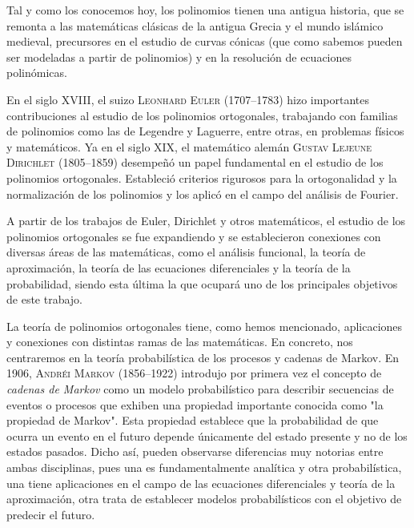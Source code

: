 %
%

Tal y como los conocemos hoy, los polinomios tienen una antigua historia, que se remonta a las matemáticas clásicas de la antigua Grecia y el mundo islámico medieval, precursores en el estudio de curvas cónicas (que como sabemos pueden ser modeladas a partir de polinomios) y en la resolución de ecuaciones polinómicas.

En el siglo XVIII, el suizo \textsc{Leonhard Euler} (1707--1783) hizo importantes contribuciones al estudio de los polinomios ortogonales, trabajando con familias de  polinomios como las de Legendre y Laguerre, entre otras, en problemas físicos y matemáticos. Ya en el siglo XIX, el matemático alemán \textsc{Gustav Lejeune Dirichlet} (1805--1859) desempeñó un papel fundamental en el estudio de los polinomios ortogonales. Estableció criterios rigurosos para la ortogonalidad y la normalización de los polinomios y los aplicó en el campo del análisis de Fourier.

A partir de los trabajos de Euler, Dirichlet y otros matemáticos, el estudio de los polinomios ortogonales se fue expandiendo y se establecieron conexiones con diversas áreas de las matemáticas, como el análisis funcional, la teoría de aproximación, la teoría de las ecuaciones diferenciales y la teoría de la probabilidad, siendo esta última la que ocupará uno de los principales objetivos de este trabajo.

La teoría de polinomios ortogonales tiene, como hemos mencionado, aplicaciones y conexiones con distintas ramas de las matemáticas. En concreto, nos centraremos en la teoría probabilística de los procesos y cadenas de Markov. En 1906, \textsc{Andréi Markov} (1856--1922) introdujo por primera vez el concepto de \textit{cadenas de Markov} como un modelo probabilístico para describir secuencias de eventos o procesos que exhiben una propiedad importante conocida como "la propiedad de Markov". Esta propiedad establece que la probabilidad de que ocurra un evento en el futuro depende únicamente del estado presente y no de los estados pasados. Dicho así, pueden observarse diferencias muy notorias entre ambas disciplinas, pues una es fundamentalmente analítica y otra probabilística, una tiene aplicaciones en el campo de las ecuaciones diferenciales y teoría de la aproximación, otra trata de establecer modelos probabilísticos con el objetivo de predecir el futuro.

